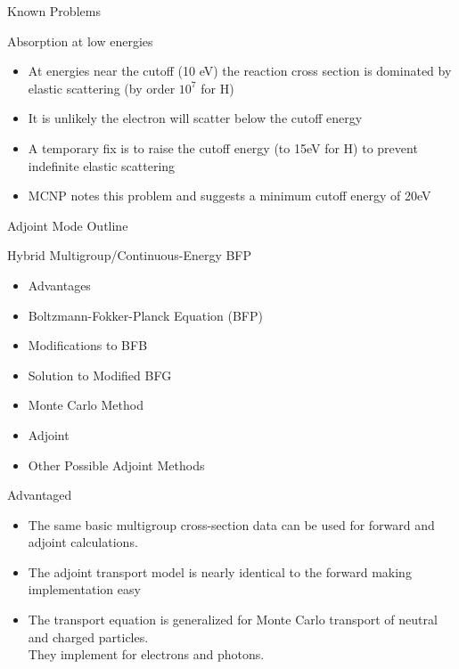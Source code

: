 \documentclass{beamer}
\begin{document}
\begin{frame}{Known Problems}
  \begin{block}{Absorption at low energies}
  \begin{itemize}
    \item At energies near the cutoff (10 eV) the reaction cross section is dominated by elastic scattering (by order $10^7$ for H)
    \item It is unlikely the electron will scatter below the cutoff energy 
    \item A temporary fix is to raise the cutoff energy (to 15eV for H) to prevent indefinite elastic scattering
    \item MCNP notes this problem and suggests a minimum cutoff energy of 20eV
  \end{itemize}
\end{block}
\end{frame}

\begin{frame}{Adjoint Mode Outline}

  \begin{block}{Hybrid Multigroup/Continuous-Energy BFP}
    \begin{itemize}
      \item Advantages
      \item Boltzmann-Fokker-Planck Equation (BFP)
      \item Modifications to BFB
      \item Solution to Modified BFG
      \item Monte Carlo Method
      \item Adjoint
      \item Other Possible Adjoint Methods
    \end{itemize}
  \end{block}
    

\end{frame}

\begin{frame}{Advantaged}
 
    \begin{itemize}
      \item The same basic multigroup cross-section data can be used for forward and adjoint calculations. 
       
      \item The adjoint transport model is nearly identical to the forward making implementation easy 

      \item The transport equation is generalized for Monte Carlo transport of neutral and charged particles.\\ They implement for electrons and photons. 

    \end{itemize}

\end{frame}
\end{document}
